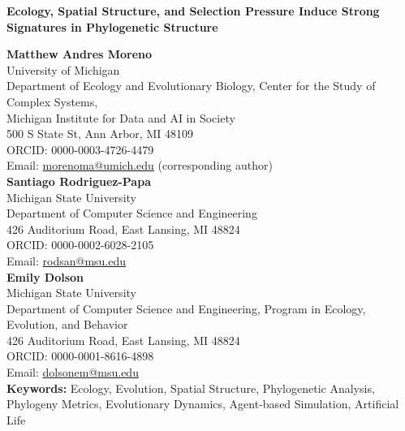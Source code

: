 \thispagestyle{empty}  %
\begin{strip}

\begin{center}
    {\Large\bf Ecology, Spatial Structure, and Selection Pressure Induce Strong Signatures in Phylogenetic Structure}\vspace{0.5cm}

    {\large\bf Matthew Andres Moreno}\\[0.5em]
    University of Michigan\\
    Department of Ecology and Evolutionary Biology, Center for the Study of Complex Systems,\\
    Michigan Institute for Data and AI in Society\\
    500 S State St, Ann Arbor, MI 48109\\
    ORCID: 0000-0003-4726-4479\\
    Email: \href{mailto:morenoma@umich.edu}{morenoma@umich.edu} (corresponding author)\\[1.5em]

    {\large\bf Santiago Rodriguez-Papa}\\[0.5em]
    Michigan State University\\
    Department of Computer Science and Engineering\\
    426 Auditorium Road, East Lansing, MI 48824\\
    ORCID: 0000-0002-6028-2105\\
    Email: \href{mailto:rodsan@msu.edu}{rodsan@msu.edu}\\[1.5em]

    {\large\bf Emily Dolson}\\[0.5em]
    Michigan State University\\
    Department of Computer Science and Engineering, Program in Ecology, Evolution, and Behavior\\
    426 Auditorium Road, East Lansing, MI 48824\\
    ORCID: 0000-0001-8616-4898\\
    Email: \href{mailto:dolsonem@msu.edu}{dolsonem@msu.edu}\\[0.5cm]

    

    \textbf{Keywords:} Ecology, Evolution, Spatial Structure, Phylogenetic Analysis, Phylogeny Metrics, Evolutionary Dynamics, Agent-based Simulation, Artificial Life

    \vfill
\end{center}
\end{strip}

~
\clearpage
\newpage